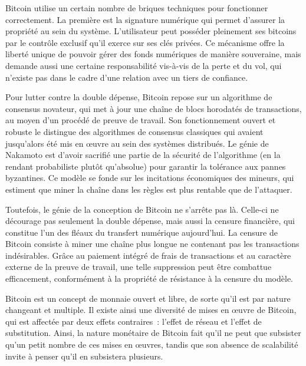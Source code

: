 Bitcoin utilise un certain nombre de briques techniques pour fonctionner correctement. La première est la signature numérique qui permet d'assurer la propriété au sein du système. L'utilisateur peut posséder pleinement ses bitcoins par le contrôle exclusif qu'il exerce sur ses clés privées. Ce mécanisme offre la liberté unique de pouvoir gérer des fonds numériques de manière souveraine, mais demande aussi une certaine responsabilité vis-à-vis de la perte et du vol, qui n'existe pas dans le cadre d'une relation avec un tiers de confiance.

Pour lutter contre la double dépense, Bitcoin repose sur un algorithme de consensus novateur, qui met à jour une chaîne de blocs horodatés de transactions, au moyen d'un procédé de preuve de travail. Son fonctionnement ouvert et robuste le distingue des algorithmes de consensus classiques qui avaient jusqu'alors été mis en œuvre au sein des systèmes distribués. Le génie de Nakamoto est d'avoir sacrifié une partie de la sécurité de l'algorithme (en la rendant probabiliste plutôt qu'absolue) pour garantir la tolérance aux pannes byzantines. Ce modèle se fonde sur les incitations économiques des mineurs, qui estiment que miner la chaîne dans les règles est plus rentable que de l'attaquer.

Toutefois, le génie de la conception de Bitcoin ne s'arrête pas là. Celle-ci ne décourage pas seulement la double dépense, mais aussi la censure financière, qui constitue l'un des fléaux du transfert numérique aujourd'hui. La censure de Bitcoin consiste à miner une chaîne plus longue ne contenant pas les transactions indésirables. Grâce au paiement intégré de frais de transactions et au caractère externe de la preuve de travail, une telle suppression peut être combattue efficacement, conformément à la propriété de résistance à la censure du modèle. %

Bitcoin est un concept de monnaie ouvert et libre, de sorte qu'il est par nature changeant et multiple. Il existe ainsi une diversité de mises en œuvre de Bitcoin, qui est affectée par deux effets contraires~: l'effet de réseau et l'effet de substitution. Ainsi, la nature monétaire de Bitcoin fait qu'il ne peut que subsister qu'un petit nombre de ces mises en œuvres, tandis que son absence de scalabilité invite à penser qu'il en subsistera plusieurs.

